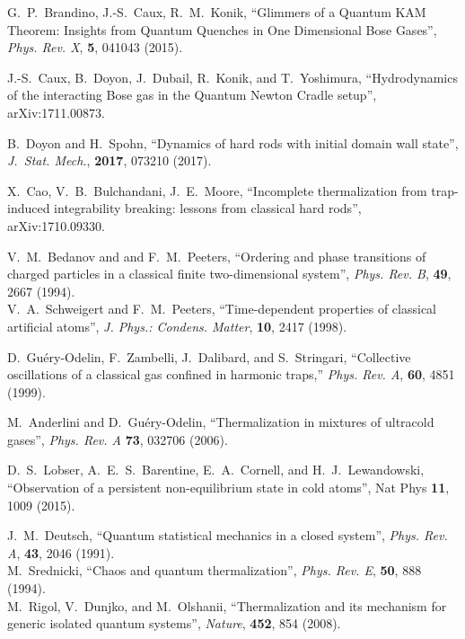 \documentclass[a4paper, onecolumn]{revtex4-1}
\begin{document}
\begin{thebibliography}{1}
G.~P.~Brandino, J.-S.~Caux, R.~M.~Konik,
``Glimmers of a Quantum KAM Theorem: Insights from Quantum Quenches in One Dimensional Bose Gases'', 
{\em Phys. Rev. X}, {\bf 5}, 041043 (2015).  

 J.-S.~Caux, B.~Doyon, J.~Dubail, R.~Konik, and T.~Yoshimura,
  ``Hydrodynamics of the interacting Bose gas in the Quantum Newton Cradle setup'',
  arXiv:1711.00873.

 B.~Doyon and H.~Spohn, ``Dynamics of hard rods with initial domain wall
  state'', {\em J.~Stat. Mech.}, {\bf 2017}, 073210 (2017).

 X.~Cao, V.~B.~Bulchandani, J.~E.~Moore, ``Incomplete thermalization from
  trap-induced integrability breaking: lessons from classical hard rods'', arXiv:1710.09330.


 V.~M.~Bedanov and and F.~M.~Peeters, ``Ordering and phase transitions of
  charged particles in a classical finite two-dimensional system'', {\em Phys. Rev. B}, {\bf 49},
  2667 (1994).
%
\\
%
V.~A.~Schweigert and F.~M.~Peeters, ``Time-dependent properties of classical
  artificial atoms'', {\em J. Phys.: Condens. Matter}, {\bf 10}, 2417 (1998).



  
D.~Gu\'ery-Odelin, F.~Zambelli, J.~Dalibard, and S.~Stringari, ``Collective
  oscillations of a classical gas confined in harmonic traps,'' {\em Phys. Rev.
  A}, {\bf 60}, 4851 (1999).

 M.~Anderlini and D.~Gu\'ery-Odelin, ``Thermalization in
  mixtures of ultracold gases'', {\em Phys. Rev. A} {\bf 73}, 032706 (2006).

 D.~S.~Lobser, A.~E.~S.~Barentine, E.~A.~Cornell, and
  H.~J.~Lewandowski, ``Observation of a persistent non-equilibrium state in cold atoms'', Nat Phys
  {\bf 11}, 1009 (2015).




J.~M.~Deutsch, ``Quantum statistical mechanics in a closed system'', {\em Phys. Rev. A}, {\bf 43}, 2046 (1991).
%
\\
%
M.~Srednicki, ``Chaos and quantum thermalization'', {\em Phys. Rev. E}, {\bf 50}, 888 (1994).
%
\\
%
M.~Rigol, V.~Dunjko, and M.~Olshanii, ``Thermalization and its mechanism for generic isolated
quantum systems'', {\em Nature}, {\bf 452}, 854 (2008).



\end{thebibliography}
\end{document}
